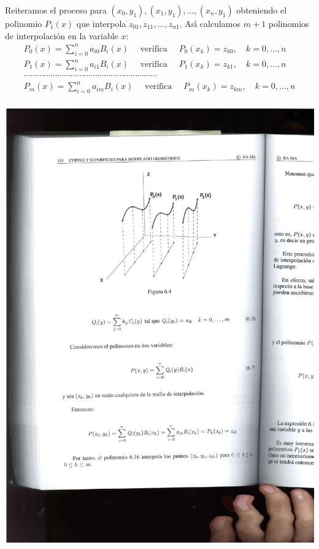 \documentclass[ebook,oneside]{memoir}
\begin{document}
Reiteramos el proceso para $(x_0,y_1),(x_1,y_1),\ldots,(x_n,y_1)$ obteniendo el polinomio $P_1(x)$ que interpola $z_{01},z_{11},\ldots,z_{n1}.$ As\'{\i} calculamos $m+1$ polinomios de interpolaci\'{o}n en la variable $x$:
$$\begin{array}{c}
P_0(x)=\sum_{i=0}^n a_{i0} B_i(x) \quad \mbox{ verifica } \quad
P_0(x_k)=z_{k0}, \quad k=0,\ldots,n \\
P_1(x)=\sum_{i=0}^n a_{i1} B_i(x) \quad \mbox{ verifica } \quad
P_1(x_k)=z_{k1}, \quad k=0,\ldots,n \\
\cdots \cdots \cdots \cdots \cdots \cdots \cdots \cdots \cdots \cdots \cdots \cdots \cdots \cdots \cdots \cdots \cdots \cdots \cdots \cdots\\
P_m(x)=\sum_{i=0}^n a_{im} B_i(x) \quad \mbox{ verifica } \quad
P_m(x_k)=z_{km}, \quad k=0,\ldots,n \\
\end{array}$$
\begin{center}
\includegraphics[scale=0.45]{6_4.pdf}
\end{center}
\end{document}
